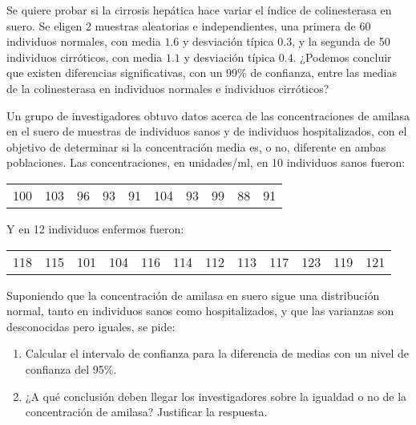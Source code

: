 {Se quiere probar si la cirrosis hepática hace variar el índice de colinesterasa en suero. Se eligen 2 muestras aleatorias e independientes,
una primera de 60 individuos normales, con media $1.6$ y desviación típica $0.3$, y la segunda de 50 individuos cirróticos, con media $1.1$
y desviación típica $0.4$. ¿Podemos concluir que existen diferencias significativas, con un 99\% de confianza, entre las medias de la
colinesterasa en individuos normales e individuos cirróticos?
}
{
}
{
}


{Un grupo de investigadores obtuvo datos acerca de las concentraciones de amilasa en el suero de muestras de individuos sanos y de
individuos hospitalizados, con el objetivo de determinar si la concentración media es, o no, diferente en ambas poblaciones. Las
concentraciones, en unidades/ml, en 10 individuos sanos fueron:
\begin{center}
\begin{tabular}{llllllllll}
100 & 103 & 96 & 93 & 91 & 104 & 93 & 99 & 88 & 91 \\
\end{tabular}
\end{center}
Y en 12 individuos enfermos fueron:
\begin{center}
\begin{tabular}{llllllllllll}
118 & 115 & 101 & 104 & 116 & 114 & 112 & 113 & 117 & 123&119&121 \\
\end{tabular}
\end{center}

Suponiendo que la concentración de amilasa en suero sigue una distribución normal, tanto en individuos sanos como hospitalizados, y que las
varianzas son desconocidas pero iguales, se pide:
\begin{enumerate}
\item Calcular el intervalo de confianza para la diferencia de medias con un nivel de confianza del 95\%.
\item ¿A qué conclusión deben llegar los investigadores sobre la igualdad o no de la concentración de amilasa? Justificar la respuesta.
\end{enumerate}
}
{
}
{
}


